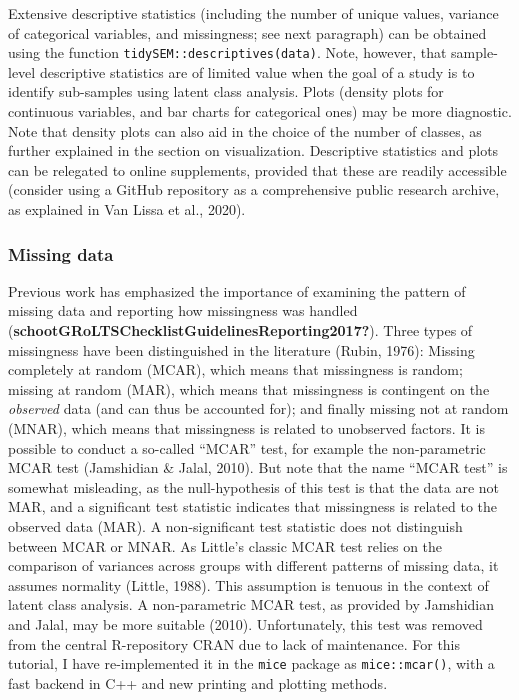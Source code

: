\documentclass[
  ,man]{apa6}
\begin{document}
Extensive descriptive statistics (including the number of unique values, variance of categorical variables, and missingness; see next paragraph) can be obtained using the function \texttt{tidySEM::descriptives(data)}.
Note, however, that sample-level descriptive statistics are of limited value when the goal of a study is to identify sub-samples using latent class analysis.
Plots (density plots for continuous variables, and bar charts for categorical ones) may be more diagnostic.
Note that density plots can also aid in the choice of the number of classes, as further explained in the section on visualization.
Descriptive statistics and plots can be relegated to online supplements, provided that these are readily accessible (consider using a GitHub repository as a comprehensive public research archive, as explained in Van Lissa et al., 2020).

\hypertarget{missing-data}{%
\subsubsection{Missing data}\label{missing-data}}

Previous work has emphasized the importance of examining the pattern of missing data and reporting how missingness was handled (\textbf{schootGRoLTSChecklistGuidelinesReporting2017?}).
Three types of missingness have been distinguished in the literature (Rubin, 1976):
Missing completely at random (MCAR), which means that missingness is random;
missing at random (MAR), which means that missingness is contingent on the \emph{observed} data (and can thus be accounted for);
and finally missing not at random (MNAR), which means that missingness is related to unobserved factors.
It is possible to conduct a so-called ``MCAR'' test,
for example the non-parametric MCAR test (Jamshidian \& Jalal, 2010).
But note that the name ``MCAR test'' is somewhat misleading,
as the null-hypothesis of this test is that the data are not MAR,
and a significant test statistic indicates that missingness is related to the observed data (MAR).
A non-significant test statistic does not distinguish between MCAR or MNAR.
As Little's classic MCAR test relies on the comparison of variances across groups with different patterns of missing data, it assumes normality (Little, 1988).
This assumption is tenuous in the context of latent class analysis.
A non-parametric MCAR test, as provided by Jamshidian and Jalal, may be more suitable (2010).
Unfortunately, this test was removed from the central R-repository CRAN due to lack of maintenance.
For this tutorial, I have re-implemented it in the \texttt{mice} package as \texttt{mice::mcar()},
with a fast backend in C++ and new printing and plotting methods.
\end{document}
